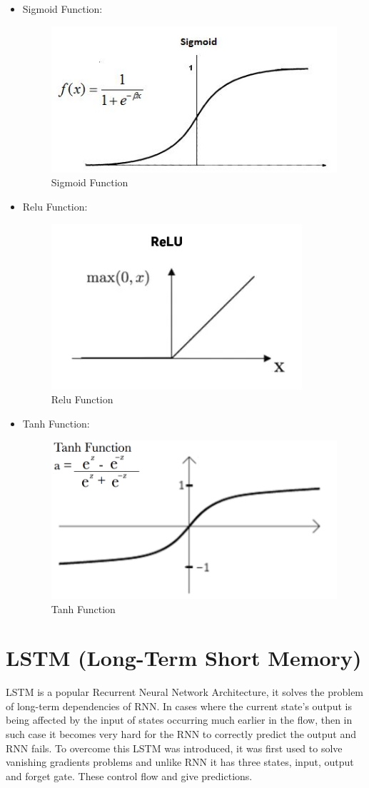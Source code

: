 \documentclass[oneside,12pt]{Classes/RoboticsLaTeX}
\begin{document}
\begin{itemize}
  \item Sigmoid Function:
  \begin{figure}[H]
    \centering
    \includegraphics[width=0.5\linewidth]{Figures/sigmoid.png}
    \caption{Sigmoid Function}
    \label{fig:sigmoid}
  \end{figure}

  \item Relu Function:
  \begin{figure}[H]
    \centering
    \includegraphics[width=0.5\linewidth]{Figures/relu.png}
    \caption{Relu Function}
    \label{fig:relu}
  \end{figure}

  \item Tanh Function:
  \begin{figure}[H]
    \centering
    \includegraphics[width=0.5\linewidth]{Figures/tanh.png}
    \caption{Tanh Function}
    \label{fig:tanh}
  \end{figure}
\end{itemize}

\section{LSTM (Long-Term Short Memory)}
LSTM is a popular Recurrent Neural Network Architecture, it solves the problem of long-term dependencies of RNN. In cases where the current state's output is being affected by the input of states occurring much earlier in the flow, then in such case it becomes very hard for the RNN to correctly predict the output and RNN fails. To overcome this LSTM was introduced, it was first used to solve vanishing gradients problems and unlike RNN it has three states, input, output and forget gate. These control flow and give predictions.
\end{document}

